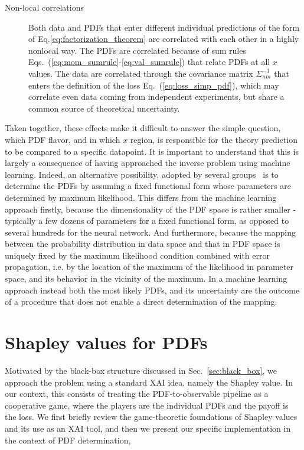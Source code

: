 \documentclass[11pt,a4paper]{article}
\begin{document}
\begin{description}
\item[Non-local correlations] Both data and PDFs that enter different individual predictions of the form of Eq.\eqref{eq:factorization_theorem} are correlated with each other in a highly nonlocal way. The PDFs are correlated because of sum rules 
Eqs.~(\ref{eq:mom_sumrule}-\ref{eq:val_sumrule})  that relate PDFs at all $x$ values. The data are correlated through the covariance matrix $ \Sigma_{nm}^{-1}$ that enters the definition of the loss Eq.~(\ref{eq:loss_simp_pdf}), which may correlate even data coming from independent experiments, but share a common source of theoretical uncertainty.
 
\end{description}
%
Taken together, these effects make it difficult to answer the  simple question,  which PDF flavor, and in which $x$ region, is responsible for the theory prediction to be compared to a specific datapoint. It is important to understand that this is largely a consequence of having approached the inverse problem using machine learning. Indeed, an alternative possibility, adopted by several groups~\cite{PDF4LHCWorkingGroup:2022cjn} is to determine the PDFs by assuming a fixed functional form whose parameters are determined by maximum likelihood. This differs from the machine learning approach firstly, because the dimensionality of the PDF space is rather smaller - typically a few dozens of parameters for a fixed functional form, as opposed to several hundreds for the neural network. And furthermore, because the mapping between the probability distribution in data space and that in PDF space is uniquely fixed by the maximum likelihood condition combined with error propagation, i.e. by the location of the maximum of the likelihood in parameter space, and its behavior in the vicinity of the maximum. In a machine learning approach instead both the most likely PDFs, and its uncertainty are the outcome of a procedure that does not enable a direct determination of the mapping. 


\section{Shapley values for PDFs}
\label{sec:shapley-values}

Motivated by the black-box structure discussed in Sec.~\ref{sec:black_box}, we approach the problem using a standard XAI idea, namely the Shapley value. In our context, this consists of treating the PDF-to-observable pipeline as a cooperative game, where the players are the individual PDFs and the payoff is the loss. We first briefly  review the game-theoretic foundations of Shapley values and its use as an XAI tool, and then we present our specific implementation in the context of PDF determination,
\end{document}

